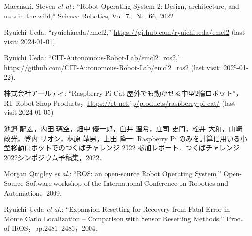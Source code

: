 \documentclass[twocolumn,9pt]{jsproceedings}
\begin{document}
\footnotesize
\begin{thebibliography}{99}

  Macenski, Steven {\it et al.}: ``Robot Operating System 2: Design, architecture, and uses in the wild,''
  Science Robotics, Vol. 7、No. 66, 2022.

  Ryuichi Ueda: ``ryuichiueda/emcl2,'' \url{https://github.com/ryuichiueda/emcl2} (last visit: 2024-01-01).

  Ryuichi Ueda: ``CIT-Autonomous-Robot-Lab/emcl2\_ros2,'' \url{https://github.com/CIT-Autonomous-Robot-Lab/emcl2_ros2} (last visit: 2025-01-22).
  
 

  株式会社アールティ: ``Raspberry Pi Cat 屋外でも動かせる中型2輪ロボット''，
  RT Robot Shop Products，\url{https://rt-net.jp/products/raspberry-pi-cat/} (last visit 2024-01-05)

  池邉 龍宏，内田 璃空，畑中 優一郎，臼井 温希，庄司 史門，松井 大和，山崎 政光，登内 リオン，林原 靖男，上田 隆一: Raspberry Pi のみを計算に用いる小型移動ロボットでのつくばチャレンジ 2022 参加レポート，つくばチャレンジ2022シンポジウム予稿集，2022．

  Morgan Quigley {\it et al.}: ``ROS: an open-source Robot Operating System,''
  Open-Source Software workshop of the International Conference on Robotics and Automation、2009.




  Ryuichi Ueda {\it et al.}: 
  ``Expansion Resetting for Recovery from Fatal Error in Monte Carlo Localization -- Comparison with Sensor Resetting Methods,'' Proc．of IROS，pp.2481--2486，2004．



\end{thebibliography}
\end{document}
